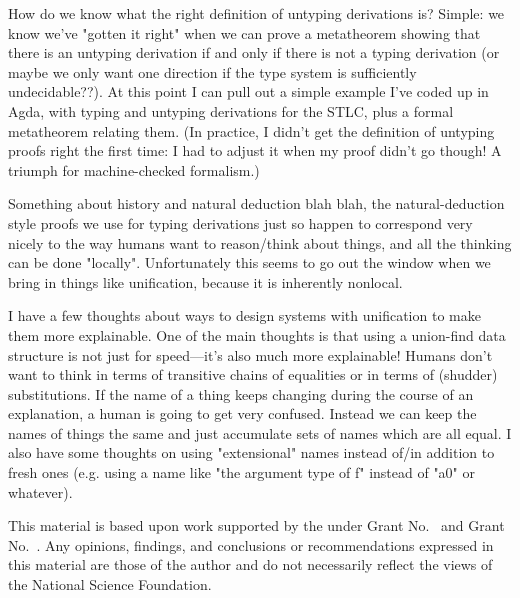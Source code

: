 \documentclass[sigplan, screen]{acmart}\settopmatter{printccs=false,printacmref=false}
\begin{document}
How do we know what the right definition of untyping derivations is?  Simple: we know we've "gotten it right" when we can prove a metatheorem showing that there is an untyping derivation if and only if there is not a typing derivation (or maybe we only want one direction if the type system is sufficiently undecidable??).  At this point I can pull out a simple example I've coded up in Agda, with typing and untyping derivations for the STLC, plus a formal metatheorem relating them.  (In practice, I didn't get the definition of untyping proofs right the first time: I had to adjust it when my proof didn't go though!  A triumph for machine-checked formalism.)

Something about history and natural deduction blah blah, the natural-deduction style proofs we use for typing derivations just so happen to correspond very nicely to the way humans want to reason/think about things, and all the thinking can be done "locally".  Unfortunately this seems to go out the window when we bring in things like unification, because it is inherently nonlocal.

I have a few thoughts about ways to design systems with unification to make them more explainable.  One of the main thoughts is that using a union-find data structure is not just for speed---it's also much more explainable!  Humans don't want to think in terms of transitive chains of equalities or in terms of (shudder) substitutions.  If the name of a thing keeps changing during the course of an explanation, a human is going to get very confused.  Instead we can keep the names of things the same and just accumulate sets of names which are all equal.  I also have some thoughts on using "extensional" names instead of/in addition to fresh ones (e.g. using a name like "the argument type of f" instead of "a0" or whatever).



\begin{acks}                            %
  This material is based upon work supported by the
   under Grant
  No.~ and Grant
  No.~.  Any opinions, findings, and
  conclusions or recommendations expressed in this material are those
  of the author and do not necessarily reflect the views of the
  National Science Foundation.
\end{acks}


%
\end{document}
